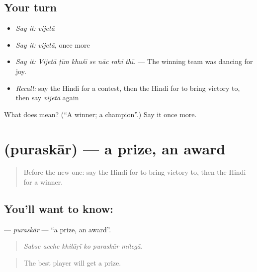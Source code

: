 \subsection*{Your turn}
\begin{itemize}
\raggedright
  \item \emph{Say it:} \emph{vijetā}
  \item \emph{Say it:} \emph{vijetā}, once more
  \item \emph{Say it:} \emph{Vijetā ṭīm khuśī se nāc rahī thī.} — The winning team was dancing for joy.
  \item \emph{Recall:} say the Hindi for a contest, then the Hindi for to bring victory to, then say \emph{vijetā} again
\end{itemize}

\begin{tcolorbox}[breakable,colback=teal!4,colframe=teal!35!black,title={Before you move on}]
What does  mean? (\textquotedblleft{}A winner; a champion\textquotedblright{}.) Say it once more.
\end{tcolorbox}
\section[\texorpdfstring{\hi{पुरस्कार} (puraskār)}{पुरस्कार (puraskār)}]{ (puraskār) — a prize, an award}

\label{lesson:HI-C534-puraskar}



\begin{quote}
Before the new one: say the Hindi for to bring victory to, then the Hindi for a winner.
\end{quote}

\subsection*{You'll want to know: }
\textbf{} — \emph{puraskār} — \textquotedblleft{}a prize, an award\textquotedblright{}.

\begin{quote}
     
\end{quote}

\begin{quote}
\emph{Sabse acche khilāṛī ko puraskār milegā.}
\end{quote}

\begin{quote}
The best player will get a prize.
\end{quote}

